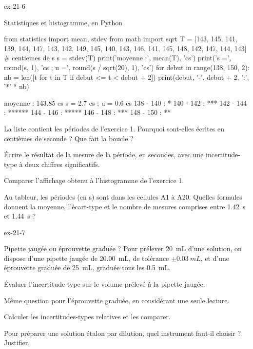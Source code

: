 \begin{blocLivre}{ex-21-6}
\begin{exercice}[2]{Statistiques et histogramme, en Python}
\begin{python}
from statistics import mean, stdev
from math import sqrt
T = [143, 145, 141, 139, 144, 147, 143, 142, 149, 145,
     140, 143, 146, 141, 145, 148, 142, 147, 144, 143]      # centiemes de s
s = stdev(T)
print('moyenne :', mean(T), 'cs')
print('s =', round(s, 1), 'cs ; u =', round(s / sqrt(20), 1), 'cs')
for debut in range(138, 150, 2):
    nb = len([t for t in T if debut <= t < debut + 2])
    print(debut, '-', debut + 2, ':', '*' * nb)
\end{python}
\begin{console}
moyenne : 143.85 cs
s = 2.7 cs ; u = 0.6 cs
138 - 140 : *
140 - 142 : ***
142 - 144 : ******
144 - 146 : *****
146 - 148 : ***
148 - 150 : **
\end{console}
\begin{questions}
\item {}La liste  contient les périodes de l'exercice 1. Pourquoi sont-elles écrites en centièmes de seconde ? Que fait la boucle  ?
\item Écrire le résultat de la mesure de la période, en secondes, avec une incertitude-type à deux chiffres significatifs.
\item Comparer l'affichage obtenu à l'histogramme de l'exercice 1.
\item Au tableur, les périodes (en s) sont dans les cellules A1 à A20. Quelles formules donnent la moyenne, l'écart-type et le nombre
de mesures comprises entre \qty{1,42}{s} et \qty{1,44}{s} ?
\end{questions}
\end{exercice}
\end{blocLivre}
\begin{blocLivre}{ex-21-7}
\begin{exercice}[2]{Pipette jaugée ou éprouvette graduée ?}
Pour prélever \qty{20}{mL} d'une solution, on dispose d'une pipette jaugée de \qty{20,00}{mL}, de tolérance $\pm\qty{0,03}{mL}$, et d'une éprouvette
graduée de \qty{25}{mL}, graduée tous les \qty{0,5}{mL}.
\begin{questions}
\item Évaluer l'incertitude-type sur le volume prélevé à la pipette jaugée.
\item Même question pour l'éprouvette graduée, en considérant une seule lecture.
\item Calculer les incertitudes-types relatives et les comparer.
\item Pour préparer une solution étalon par dilution, quel instrument faut-il choisir ? Justifier.
\end{questions}
\end{exercice}
\end{blocLivre}
